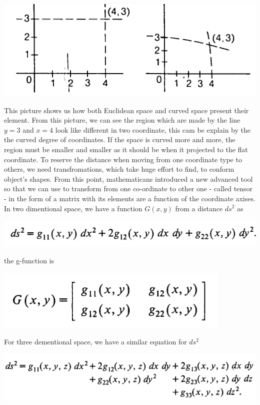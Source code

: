\documentclass[11pt,a4paper]{article}
\begin{document}
	 \begin{center}
	  \includegraphics[scale=0.75]{./Fig66_coordinate.png}
	 \end{center}
	 This picture shows us how both Euclidean space and curved space present their element. From this picture, we can see the region which are made by the line $y = 3$ and  $x = 4$  look like different in two coordinate, this cam be explain by the the curved degree of coordinates. If the space is curved more and more, the region must be smaller and smaller as it should be when it projected to the flat coordinate. To reserve the distance when moving from one coordinate type to others, we need  transfromations, which take huge effort to find, to conform object's shapes. From this point, mathematicans introduced a new advanced tool so that we can use to transform from one co-ordinate to other one - called tensor - in the form of a matrix with its elements are a function of the coordinate axises. In two dimentional space, we have a function $G(x,y)$  from a distance $ds^2$ as	 
	 \begin{center}
	 	\includegraphics[scale=0.4]{./ds2d.png}
	 \end{center}	 
	the g-function is 	
	\begin{center}
		\includegraphics[scale=0.4]{./G2d.png}
	\end{center}
	For three dementional space, we have a similar equation for $ds^2$  
	\begin{center}
		\includegraphics[scale=0.4]{./ds23d.png}
	\end{center}	 
\end{document}
